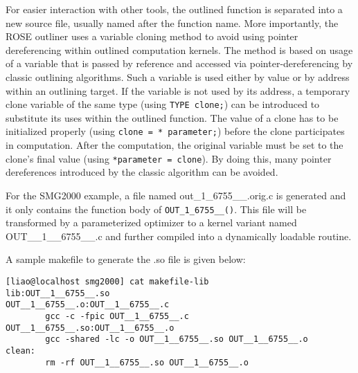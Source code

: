 For easier interaction with other tools, the outlined function is separated
into a new source file, usually named after 
the function name.  
More importantly, the ROSE outliner uses a variable cloning method to
avoid using pointer dereferencing within outlined computation kernels. 
The method is based on usage of a variable that is passed by reference and
accessed
via pointer-dereferencing by classic outlining algorithms.
Such a variable is used either by value or by address within an outlining
target.
If the variable is not used by its address,
a temporary clone variable of the same type (using \lstinline{TYPE clone;})
can be introduced to substitute its uses within the outlined function.
The value of a clone has to be
initialized properly (using \lstinline{clone = * parameter;})
before the clone participates in computation.
After the computation, the original variable must be set to the clone's
final value
(using \lstinline{*parameter = clone}).
By doing this, many pointer dereferences introduced by the classic
algorithm can be avoided.


For the SMG2000 example, a file named out\_1\_6755\_\_.orig.c 
is generated and it only contains the function body of \lstinline{OUT_1_6755__()}. 
This file will be transformed by a parameterized optimizer to a kernel
variant named OUT\_\_1\_\_6755\_\_.c and further compiled into a dynamically
loadable routine.

A sample makefile to generate the .so file is given below: 

{\mySmallFontSize
\begin{verbatim}
[liao@localhost smg2000] cat makefile-lib
lib:OUT__1__6755__.so
OUT__1__6755__.o:OUT__1__6755__.c
        gcc -c -fpic OUT__1__6755__.c
OUT__1__6755__.so:OUT__1__6755__.o
        gcc -shared -lc -o OUT__1__6755__.so OUT__1__6755__.o
clean:
        rm -rf OUT__1__6755__.so OUT__1__6755__.o
\end{verbatim}
}


